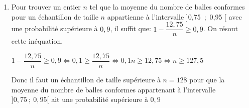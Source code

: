 \documentclass[10pt]{article}
\providecommand{\np}[2][]{{#2~#1}}
\begin{document}
\begin{enumerate}
\begin{enumerate}

On déduit donc:
$P(0,75 < M_n < 0,95) \geqslant  1 - \dfrac{12,75}{n}$.

		\item Pour trouver un entier $n$ tel que la moyenne du nombre de balles conformes pour un échantillon de taille $n$ appartienne à l'intervalle ]0,75~;~0,95 [ avec une probabilité supérieure à $0,9$, il suffit que: $1 - \dfrac{12,75}{n}\geqslant 0,9$.
On résout cette inéquation.

$1 - \dfrac{12,75}{n}\geqslant 0,9
 \iff 0,1\geqslant \dfrac{12,75}{n}
\iff 0,1n \geqslant 12,75
\iff n \geqslant 127,5$

Donc il faut un échantillon de taille supérieure à $n=128$ pour  que  la moyenne du nombre de balles conformes  appartenant à l'intervalle $]0,75~;~0,95[$ ait une probabilité supérieure à $0,9$
	\end{enumerate}
\end{enumerate}

\vspace{0,5cm}
\end{document}
